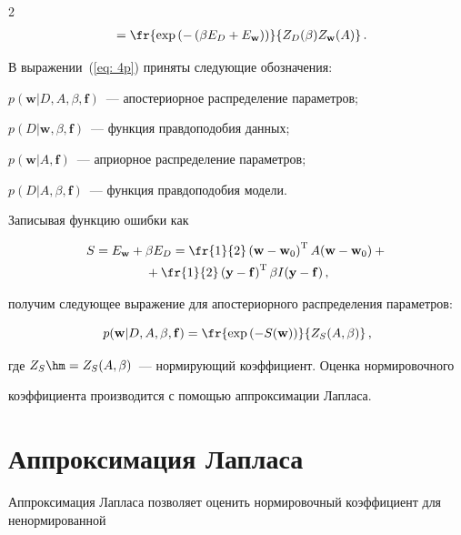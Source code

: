 \begin{multicols}{2}
\begin{align}
&\hspace*{5mm}{}=

\fr{\exp\left(-\left(\beta E_D+E_\mathbf{w}\right)\right)}{Z_{D}(\beta)Z_{\mathbf{w}}(A)}\,.\notag

\end{align}

В выражении~(\ref{eq: 4p}) приняты следующие обозначения:

$p(\mathbf{w}|D,A,\beta,\mathbf{f})$~--- апостериорное распределение параметров;

$p(D|\mathbf{w},\beta,\mathbf{f})$~--- функция правдоподобия данных;

$p(\mathbf{w}|A,\mathbf{f})$~--- априорное распределение па\-ра\-мет\-ров;

$p(D|A,\beta,\mathbf{f})$~--- функция правдоподобия модели.

Записывая функцию ошибки как

\begin{multline}

\label {eq: S(w)}

S=E_\mathbf{w}+\beta E_D=\fr{1}{2}\left(\mathbf{w}-\mathbf{w}_0\right)^{\mathrm{T}}

A(\mathbf{w}-\mathbf{w}_0)+{}\\

{}+\fr{1}{2}\left(\mathbf{y}-\mathbf{f}\right)^{\mathrm{T}}

\beta I(\mathbf{y}-\mathbf{f})\,,

\end{multline}

получим следующее выражение для апостериорного распределения параметров: 

$$

p(\mathbf{w}|D,A,\beta,\mathbf{f})=

\fr{\exp\left(-S(\mathbf{w})\right)}{Z_S(A,\beta)}\,,

$$ 

где $Z_S\hm=Z_{S}(A,\beta)$~--- нормирующий коэффициент. Оценка нормировочного 

коэффициента производится с помощью аппроксимации Лапласа.



\section{Аппроксимация Лапласа}



Аппроксимация Лапласа позволяет оценить нормировочный коэффициент для ненормированной 


\end{multicols}
